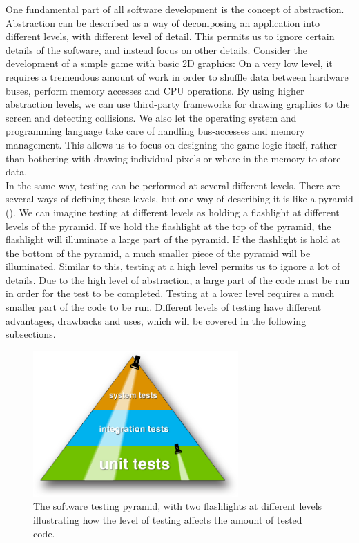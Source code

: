 
\label{sec:theory_levels}

One fundamental part of all software development is the concept of
abstraction. Abstraction can be described as a way of decomposing  an
application into different levels, with different level of detail. This
permits us to ignore certain details of the software, and  instead
focus on other details. Consider the development of a simple game with
basic 2D graphics: On a very low level, it requires a tremendous amount
of work in order to shuffle data between hardware buses, perform memory
accesses and CPU operations. By using higher abstraction levels, we can
use third-party frameworks for drawing graphics to the screen and
detecting collisions. We also let the operating system and programming
language take care of handling bus-accesses and memory management. This
allows us to focus on designing the game logic itself, rather than
bothering with drawing individual pixels or where in the memory to store
data.\cite{paper:abstraction}\\

In the same way, testing can be performed at several different levels.
There are several ways of defining these levels, but one way of
describing it is like a pyramid (). We can
imagine testing at different levels as holding a flashlight at different
levels of the pyramid. If we hold the flashlight at the top of the
pyramid, the flashlight will illuminate a large part of the pyramid. If
the flashlight is hold at the bottom of the pyramid, a much smaller
piece of the pyramid will be illuminated. Similar to this, testing at a
high level permits us to ignore a lot of details. Due to the high level
of abstraction, a large part of the code must be run in order for the
test to be completed. Testing at a lower level requires a much smaller part
of the code to be run. Different levels of testing have different
advantages, drawbacks and uses, which will be covered in the following
subsections.\\

\begin{figure}
\centering
\includegraphics[width=0.7\textwidth]{theory/levels/triangle}
\caption{The software testing pyramid, with two flashlights at different
         levels illustrating how the level of testing affects the amount
         of tested code.}
\label{fig:testing_pyramid}
\end{figure}
